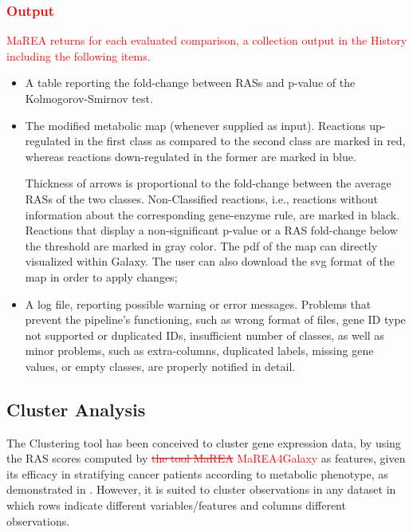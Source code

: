 \documentclass[preprint,12pt,authoryear]{elsarticle}
\newcommand{\red}{\textcolor{red}}
\newcommand{\mareagalaxy}{\textsf{MaREA4Galaxy}}
\newcommand{\mareaTool}{\textsf{MaREA}}
\newcommand{\clusterTool}{\textsf{Clustering}}
\begin{document}
\red{\subsubsection{Output}}

\red{\mareaTool{} returns for each evaluated comparison, a collection
  output in the History including the following items.}

\begin{itemize}
\item A table reporting the fold-change between RASs and p-value of
  the Kolmogorov-Smirnov test.
  
\item The modified metabolic map (whenever supplied as
  input). Reactions up-regulated in the first class as compared to the
  second class  are marked in red, whereas reactions down-regulated in
  the former are marked in blue.
  
  Thickness of arrows is proportional to the fold-change between the
  average RASs of the two classes. Non-Classified reactions, i.e.,
  reactions without information about the corresponding gene-enzyme
  rule, are marked in black.
  Reactions that display a non-significant p-value or a RAS
  fold-change below the threshold are marked in gray color. The pdf of
  the map can directly visualized within Galaxy. The user can also
  download the svg format of the map in order to apply changes;
  
\item A log file, reporting possible warning or error
  messages. Problems that prevent the pipeline's functioning, such as
  wrong format of files, gene ID type not supported or duplicated IDs,
  insufficient number of classes, as well as minor problems, such as
  extra-columns, duplicated labels, missing gene values, or empty
  classes, are properly notified in detail.
\end{itemize}


\subsection{Cluster Analysis}

The \clusterTool{} tool has been conceived to cluster gene expression
data, by using the RAS scores computed by \red{\sout{the tool
    \mareaTool{}} \mareagalaxy{}} as features, given its efficacy in
stratifying cancer patients according to metabolic phenotype, as
demonstrated in \citep{marea}. However, it is suited to cluster
observations in any dataset in which rows indicate different
variables/features and columns different observations.
\end{document}

